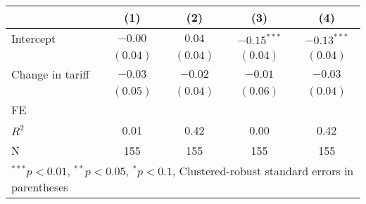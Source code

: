 
\begin{tabular}{l c c c c }
\hline
 & (1) & (2) & (3) & (4) \\
\hline
Intercept & $-0.00$  & $0.04$   & $-0.15^{***}$ & $-0.13^{***}$ \\
            & $(0.04)$ & $(0.04)$ & $(0.04)$      & $(0.04)$      \\
Change in tariff     & $-0.03$  & $-0.02$  & $-0.01$       & $-0.03$       \\
            & $(0.05)$ & $(0.04)$ & $(0.06)$      & $(0.04)$      \\
\hline
FE          &                &                &                &                \\ 
\hline
$R^2$       & 0.01     & 0.42     & 0.00          & 0.42          \\
N           & 155      & 155      & 155           & 155           \\
\hline
\multicolumn{5}{l}{\scriptsize{$^{***}p<0.01$, $^{**}p<0.05$, $^*p<0.1$, Clustered-robust standard errors in parentheses}}
\end{tabular}
